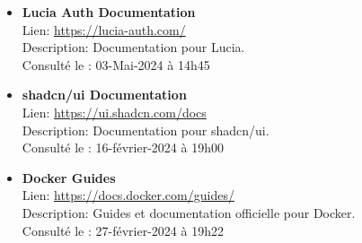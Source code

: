 \documentclass[12pt,french]{extreport}
\begin{document}
\begin{itemize}
    \item \textbf{Lucia Auth Documentation} \\
    Lien: \url{https://lucia-auth.com/} \\
    Description: Documentation pour Lucia. \\
    Consulté le : 03-Mai-2024 à 14h45

    \item \textbf{shadcn/ui Documentation} \\
    Lien: \url{https://ui.shadcn.com/docs} \\
    Description: Documentation pour shadcn/ui. \\
    Consulté le : 16-février-2024 à 19h00

    \item \textbf{Docker Guides} \\
    Lien: \url{https://docs.docker.com/guides/} \\
    Description: Guides et documentation officielle pour Docker. \\
    Consulté le : 27-février-2024 à 19h22


\end{itemize}
\end{document}

